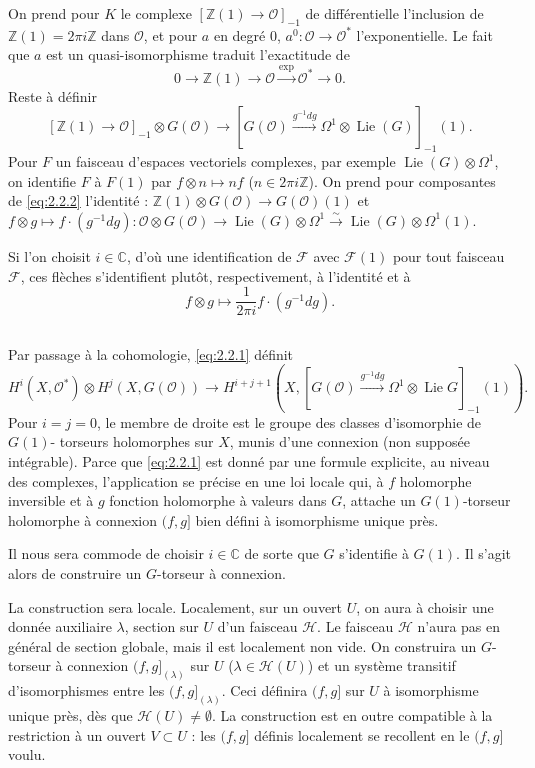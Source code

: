 \documentclass[12pt,a4paper]{article}
\theoremstyle{plain}
\theoremstyle{definition}
\theoremstyle{remark}
\newcommand{\cO}{\mathcal{O}}
\newcommand{\cH}{\mathcal{H}}
\newcommand{\cF}{\mathcal{F}}
\newcommand{\Z}{\mathbb{Z}}
\newcommand{\C}{\mathbb{C}}
\providecommand{\cF}{\mathcal{F}}
\providecommand{\cH}{\mathcal{H}}
\providecommand{\cO}{\mathcal{O}}
\begin{document}
On prend pour $K$ le complexe $[\Z(1) \to \cO]_{-1}$ de différentielle l'inclusion de
$\Z(1) = 2\pi i\Z$ dans $\cO$, et pour $a$ en degré $0$, $a^0 : \cO \to \cO^*$ l'exponentielle. Le fait que $a$
est un quasi-isomorphisme traduit l'exactitude de
\[
0 \to \Z(1) \to \cO \xrightarrow{\exp} \cO^* \to 0.
\]
Reste à définir
\begin{equation}\label{eq:2.2.2}
[\Z(1) \to \cO]_{-1} \otimes G(\cO) \to [G(\cO) \xrightarrow{g^{-1}dg} \Omega^1 \otimes \operatorname{Lie}(G)]_{-1}(1).
\end{equation}
Pour $F$ un faisceau d'espaces vectoriels complexes, par exemple $\operatorname{Lie}(G) \otimes \Omega^1$, on identifie
$F$ à $F(1)$ par $f \otimes n \mapsto nf$ ($n \in 2\pi i\Z$). On prend pour composantes de \eqref{eq:2.2.2}
l'identité : $\Z(1) \otimes G(\cO) \to G(\cO)(1)$
et
$f \otimes g \mapsto f \cdot (g^{-1}dg) : \cO \otimes G(\cO) \to \operatorname{Lie}(G) \otimes \Omega^1 \xrightarrow{\sim} \operatorname{Lie}(G) \otimes \Omega^1(1)$.

Si l'on choisit $i \in \C$, d'où une identification de $\cF$ avec $\cF(1)$ pour tout faisceau $\cF$,
ces flèches s'identifient plutôt, respectivement, à l'identité et à
\[
f \otimes g \mapsto \frac{1}{2\pi i} f \cdot (g^{-1}dg).
\]

\subsection{}

Par passage à la cohomologie, \eqref{eq:2.2.1} définit
\[
H^i(X, \cO^*) \otimes H^j(X, G(\cO)) \to H^{i+j+1}(X, [G(\cO) \xrightarrow{g^{-1}dg} \Omega^1 \otimes \operatorname{Lie} G]_{-1}(1)).
\]
Pour $i = j = 0$, le membre de droite est le groupe des classes d'isomorphie de $G(1)$-
torseurs holomorphes sur $X$, munis d'une connexion (non supposée intégrable). Parce
que \eqref{eq:2.2.1} est donné par une formule explicite, au niveau des complexes, l'application
se précise en une loi locale qui, à $f$ holomorphe inversible et à $g$ fonction holomorphe
à valeurs dans $G$, attache un $G(1)$-torseur holomorphe à connexion $(f,g]$ bien défini
à isomorphisme unique près.

Il nous sera commode de choisir $i \in \C$ de sorte que $G$ s'identifie à $G(1)$. Il s'agit
alors de construire un $G$-torseur à connexion.

La construction sera locale. Localement, sur un ouvert $U$, on aura à choisir une
donnée auxiliaire $\lambda$, section sur $U$ d'un faisceau $\cH$. Le faisceau $\cH$ n'aura pas en
général de section globale, mais il est localement non vide. On construira un $G$-torseur à connexion $(f,g]_{(\lambda)}$ sur $U$ ($\lambda \in \cH(U)$) et un système transitif d'isomorphismes entre les $(f,g]_{(\lambda)}$.
Ceci définira $(f,g]$ sur $U$ à isomorphisme unique près, dès que $\cH(U) \neq \emptyset$. La
construction est en outre compatible à la restriction à un ouvert $V \subset U$ : les $(f,g]$ définis
localement se recollent en le $(f,g]$ voulu.
\end{document}
